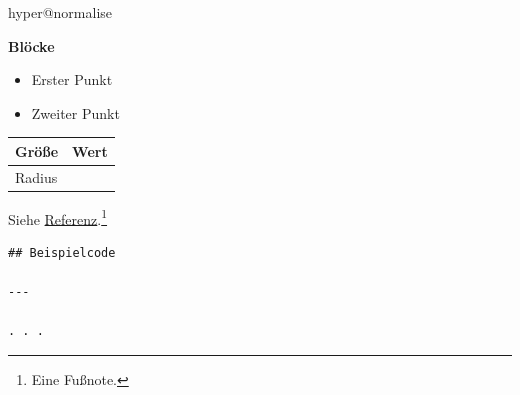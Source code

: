\ifcsname hyper@normalise\endcsname\else\PackageError{mark2tex}{Markdown links require hyperref}{Load \string\usepackage{hyperref} in the document preamble.}\fi
\begin{frame}[t,fragile]
\par\medskip\noindent\textbf{Blöcke}\par


\begin{itemize}
\item Erster Punkt
\item Zweiter Punkt
\end{itemize}

\par\addvspace{\medskipamount}
\noindent\begin{tabularx}{\linewidth}{@{}>{\raggedright\arraybackslash}X>{\raggedleft\arraybackslash}X@{}}
\toprule
Größe & Wert \\
\midrule
Radius & 2 \\
\bottomrule
\end{tabularx}
\par\addvspace{\medskipamount}

Siehe \href{\detokenize{https://example.org}}{Referenz}.\footnote{\label{mark2tex:footnote:3d2bdb32491d5a65b133d158edfeba11:1}Eine Fußnote.}

\begin{verbatim}
## Beispielcode

---

. . .
\end{verbatim}


\end{frame}


